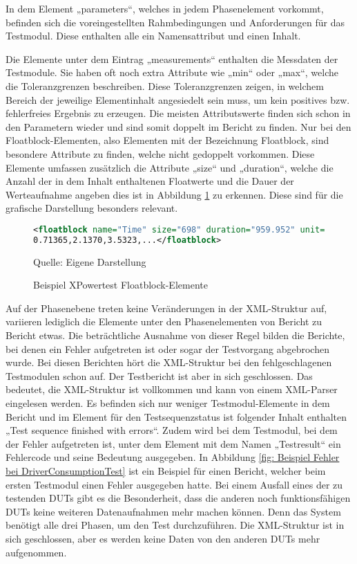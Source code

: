 In dem Element „parameters“, welches in jedem Phasenelement vorkommt, befinden sich die voreingestellten Rahmbedingungen
und Anforderungen für das Testmodul. Diese enthalten alle ein Namensattribut und einen Inhalt.

Die Elemente unter dem Eintrag „measurements“ enthalten die Messdaten der Testmodule. Sie haben oft noch extra Attribute
wie „min“ oder „max“, welche die Toleranzgrenzen beschreiben. Diese Toleranzgrenzen zeigen, in welchem Bereich der jeweilige
Elementinhalt angesiedelt sein muss, um kein positives bzw. fehlerfreies Ergebnis zu erzeugen.
Die meisten Attributswerte finden sich schon in den Parametern wieder und sind somit doppelt im Bericht zu finden.
Nur bei den Floatblock-Elementen, also Elementen mit der Bezeichnung Floatblock, sind besondere Attribute zu finden,
welche nicht gedoppelt vorkommen.
Diese Elemente umfassen zusätzlich die Attribute „size“ und „duration“, welche die Anzahl der in dem Inhalt enthaltenen
Floatwerte und die Dauer der Werteaufnahme angeben dies ist in Abbildung \ref{fig: Beispiel XPowertest Floatblock-Elemente} zu erkennen.
Diese sind für die grafische Darstellung besonders relevant.

\begin{figure}[H]
\centering
\begin{minipage}{0.95\textwidth}
\begin{lstlisting}[language=XML]
<floatblock name="Time" size="698" duration="959.952" unit="s">
0.71365,2.1370,3.5323,...</floatblock>
\end{lstlisting}
\end{minipage}
\caption{Beispiel XPowertest Floatblock-Elemente}
\label{fig: Beispiel XPowertest Floatblock-Elemente}
    {Quelle: Eigene Darstellung}
\end{figure}

Auf der Phasenebene treten keine Veränderungen in der \ac{XML}-Struktur auf, variieren lediglich die Elemente unter den
Phasenelementen von Bericht zu Bericht etwas.
Die beträchtliche Ausnahme von dieser Regel bilden die Berichte, bei denen ein Fehler aufgetreten ist oder sogar der
Testvorgang abgebrochen wurde. Bei diesen Berichten hört die \ac{XML}-Struktur bei den fehlgeschlagenen Testmodulen schon auf.
Der Testbericht ist aber in sich geschlossen. Das bedeutet, die \ac{XML}-Struktur ist vollkommen und kann von einem \ac{XML}-Parser eingelesen werden.
Es befinden sich nur weniger Testmodul-Elemente in dem Bericht und im Element für den Testsequenzstatus ist folgender Inhalt
enthalten „Test sequence finished with errors“. Zudem wird bei dem Testmodul, bei dem der Fehler aufgetreten ist, unter
dem Element mit dem Namen „Testresult“ ein Fehlercode und seine Bedeutung ausgegeben. In Abbildung \ref{fig: Beispiel Fehler bei DriverConsumptionTest} ist ein
Beispiel für einen Bericht, welcher beim ersten Testmodul einen Fehler ausgegeben hatte.
Bei einem Ausfall eines der zu testenden \ac{DUTs} gibt es die Besonderheit, dass die anderen noch funktionsfähigen \ac{DUTs}
keine weiteren Datenaufnahmen mehr machen können. Denn das System benötigt alle drei Phasen, um den Test durchzuführen.
Die \ac{XML}-Struktur ist in sich geschlossen, aber es werden keine Daten von den anderen \ac{DUTs} mehr aufgenommen.


